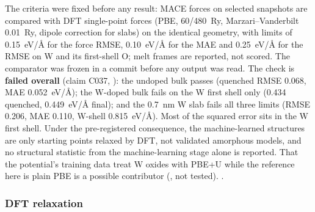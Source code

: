 The criteria were fixed before any result: MACE forces on selected snapshots are compared with DFT single-point forces
(PBE, 60/480~Ry, Marzari--Vanderbilt 0.01~Ry, dipole correction for slabs) on the identical geometry, with limits of
\SI{0.15}{eV/\angstrom} for the force RMSE, \SI{0.10}{eV/\angstrom} for the MAE and \SI{0.25}{eV/\angstrom} for the
RMSE on W and its first-shell O; melt frames are reported, not scored. %
The comparator was frozen in a commit before any output was read. %
The check is \textbf{failed overall} (claim C037, ): the undoped bulk passes (quenched RMSE 0.068, MAE
\SI{0.052}{eV/\angstrom}); the W-doped bulk fails on the W first shell only (0.434 quenched, \SI{0.449}{eV/\angstrom}
final); and the \SI{0.7}{nm} W slab fails all three limits (RMSE 0.206, MAE 0.110, W-shell
\SI{0.815}{eV/\angstrom}). %
Most of the squared error sits in the W first shell. %
Under the pre-registered consequence, the machine-learned structures are only starting points relaxed by DFT, not
validated amorphous models, and no structural statistic from the machine-learning stage alone is reported. %
That the potential's training data treat W oxides with PBE+U while the reference here is plain PBE is a possible
contributor (, not tested). %
. %

\subsubsection{DFT relaxation}
\label{sec:m-dft-relax}

